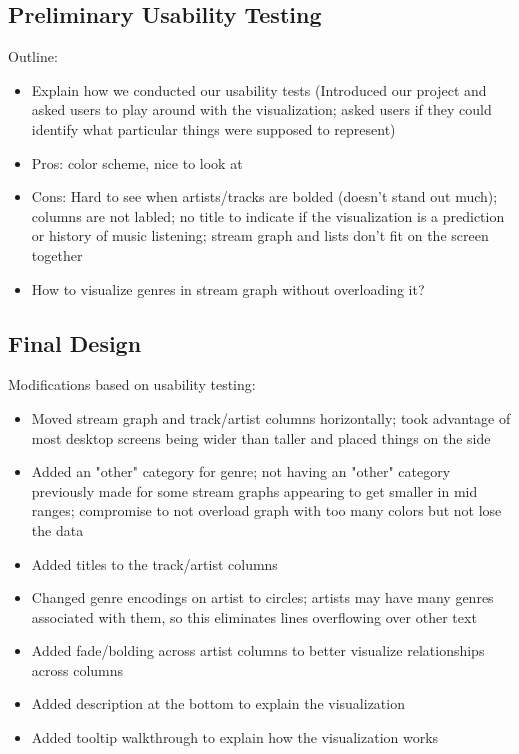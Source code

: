 \documentclass[journal]{vgtc}                %
\begin{document}
\subsection{Preliminary Usability Testing}
Outline:
\begin{itemize}
  \item Explain how we conducted our usability tests (Introduced our project and asked users to play around with the visualization; asked users if they could identify what particular things were supposed to represent)
  \item Pros: color scheme, nice to look at
  \item Cons: Hard to see when artists/tracks are bolded (doesn't stand out much); columns are not labled; no title to indicate if the visualization is a prediction or history of music listening; stream graph and lists don't fit on the screen together
  \item How to visualize genres in stream graph without overloading it?
\end{itemize}



\subsection{Final Design}

Modifications based on usability testing:
\begin{itemize}
  \item Moved stream graph and track/artist columns horizontally; took advantage of most desktop screens being wider than taller and placed things on the side
  \item Added an "other" category for genre; not having an "other" category previously made for some stream graphs appearing to get smaller in mid ranges; compromise to not overload graph with too many colors but not lose the data
  \item Added titles to the track/artist columns
  \item Changed genre encodings on artist to circles; artists may have many genres associated with them, so this eliminates lines overflowing over other text
  \item Added fade/bolding across artist columns to better visualize relationships across columns
  \item Added description at the bottom to explain the visualization
  \item Added tooltip walkthrough to explain how the visualization works
\end{itemize}
\end{document}
